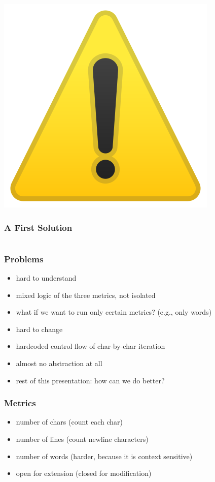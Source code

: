 \documentclass[aspectratio=169]{beamer}
\begin{document}
\begin{frame}
\begin{center}
    \includegraphics{static-images/warning.png}
  \end{center}
\end{frame}

\begin{frame}[fragile]
  \frametitle{A First Solution}
  \inputminted[fontsize=\small]{scala}{snippets/imperative-wc.scala}
\end{frame}

\begin{frame}
  \frametitle{Problems}
  \begin{itemize}
  \item hard to understand
  \item mixed logic of the three metrics, not isolated
  \item what if we want to run only certain metrics? (e.g., only words)
  \item hard to change
  \item hardcoded control flow of char-by-char iteration
  \item almost no abstraction at all
  \item rest of this presentation: how can we do better?
  \end{itemize}
\end{frame}

\begin{frame}
  \frametitle{Metrics}
  \begin{itemize}
  \item number of chars (count each char)
  \item number of lines (count newline characters)
  \item number of words (harder, because it is context sensitive)
  \item open for extension (closed for modification)
  \end{itemize}
\end{frame}
\end{document}
